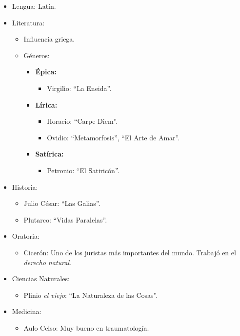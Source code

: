 \begin{itemize}

\item Lengua: Latín.

\item Literatura:
\begin{itemize}
	\item Influencia griega.
	\item Géneros:
		\begin{itemize}
			\item \textbf{Épica:}
				\begin{itemize}
					\item Virgilio: ``La Eneida''.
				\end{itemize}
			\item \textbf{Lírica:}
				\begin{itemize}
					\item Horacio: ``Carpe Diem''.
					\item Ovidio: ``Metamorfosis'', ``El Arte de Amar''.
				\end{itemize}
			\item \textbf{Satírica:}
				\begin{itemize}
					\item Petronio: ``El Satiricón''.
				\end{itemize}
		\end{itemize}
\end{itemize}

\item Historia:
\begin{itemize}
	\item Julio César: ``Las Galias''.
	\item Plutarco: ``Vidas Paralelas''.
\end{itemize}

\item Oratoria:
\begin{itemize}
	\item Cicerón: Uno de los juristas más importantes del mundo. Trabajó en el \emph{derecho natural}.
\end{itemize}

\item Ciencias Naturales:
\begin{itemize}
	\item Plinio \emph{el viejo}: ``La Naturaleza de las Cosas''.
\end{itemize}

\item Medicina:
\begin{itemize}
	\item Aulo Celso: Muy bueno en traumatología.
\end{itemize}


\end{itemize}
